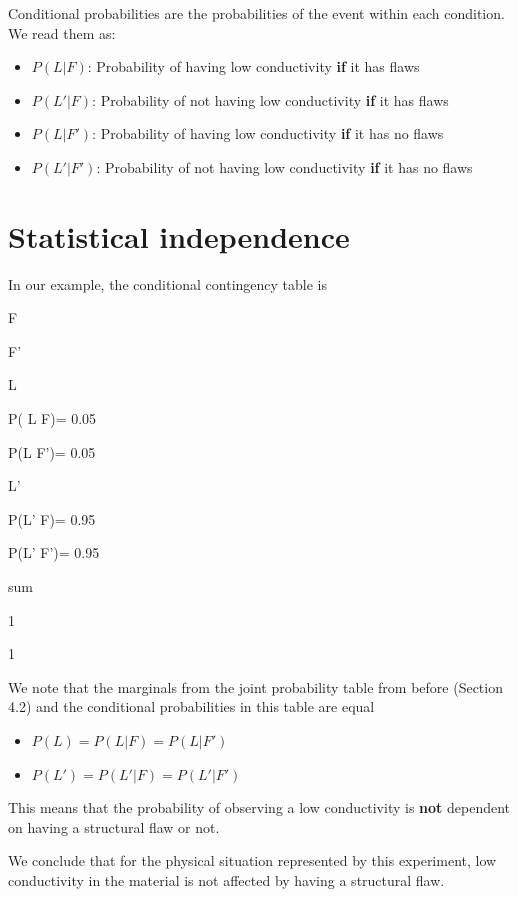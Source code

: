 \documentclass[
]{book}
\providecommand{\tightlist}{%
  \setlength{\itemsep}{0pt}\setlength{\parskip}{0pt}}
\begin{document}
Conditional probabilities are the probabilities of the event within each condition. We read them as:

\begin{itemize}
\tightlist
\item
  \(P(L| F)\): Probability of having low conductivity \textbf{if} it has flaws
\item
  \(P(L'| F)\): Probability of not having low conductivity \textbf{if} it has flaws
\item
  \(P(L|F ')\): Probability of having low conductivity \textbf{if} it has no flaws
\item
  \(P(L'|F ')\): Probability of not having low conductivity \textbf{if} it has no flaws
\end{itemize}

\hypertarget{statistical-independence-1}{%
\section{Statistical independence}\label{statistical-independence-1}}

In our example, the conditional contingency table is

F

F'

L

P( L {\textbar{}} F)= 0.05

P(L {\textbar{}} F')= 0.05

L'

P(L' {\textbar{}} F)= 0.95

P(L' {\textbar{}} F')= 0.95

sum

1

1

We note that the marginals from the joint probability table from before (Section 4.2) and the conditional probabilities in this table are equal

\begin{itemize}
\tightlist
\item
  \(P(L)=P(L| F)= P(L|F')\)
\item
  \(P(L')=P(L'| F)= P(L'|F')\)
\end{itemize}

This means that the probability of observing a low conductivity is \textbf{not} dependent on having a structural flaw or not.

We conclude that for the physical situation represented by this experiment, low conductivity in the material is not affected by having a structural flaw.
\end{document}
